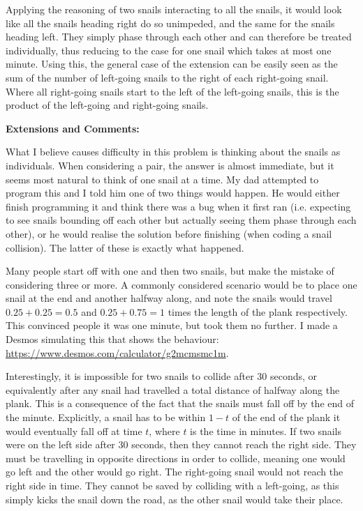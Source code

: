 Applying the reasoning of two snails interacting to all the snails, it would look like all the snails heading right do so unimpeded, and the same for the snails heading left. They simply phase through each other and can therefore be treated individually, thus reducing to the case for one snail which takes at most one minute. Using this, the general case of the extension can be easily seen as the sum of the number of left-going snails to the right of each right-going snail. Where all right-going snails start to the left of the left-going snails, this is the product of the left-going and right-going snails.

\textbf{Extensions and Comments:}

What I believe causes difficulty in this problem is thinking about the snails as individuals. When considering a pair, the answer is almost immediate, but it seems most natural to think of one snail at a time. My dad attempted to program this and I told him one of two things would happen. He would either finish programming it and think there was a bug when it first ran (i.e. expecting to see snails bounding off each other but actually seeing them phase through each other), or he would realise the solution before finishing (when coding a snail collision). The latter of these is exactly what happened.

Many people start off with one and then two snails, but make the mistake of considering three or more. A commonly considered scenario would be to place one snail at the end and another halfway along, and note the snails would travel $0.25 + 0.25 = 0.5$ and $0.25 + 0.75 = 1$ times the length of the plank respectively. This convinced people it was one minute, but took them no further. I made a Desmos simulating this that shows the behaviour: \url{https://www.desmos.com/calculator/g2mcmsmc1m}.

Interestingly, it is impossible for two snails to collide after 30 seconds, or equivalently after any snail had travelled a total distance of halfway along the plank. This is a consequence of the fact that the snails must fall off by the end of the minute. Explicitly, a snail has to be within $1 - t$ of the end of the plank it would eventually fall off at time $t$, where $t$ is the time in minutes. If two snails were on the left side after 30 seconds, then they cannot reach the right side. They must be travelling in opposite directions in order to collide, meaning one would go left and the other would go right. The right-going snail would not reach the right side in time. They cannot be saved by colliding with a left-going, as this simply kicks the snail down the road, as the other snail would take their place.

